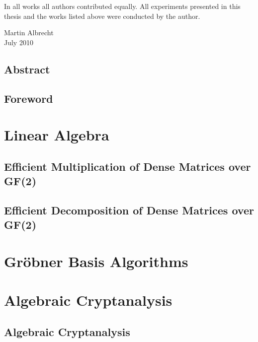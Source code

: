 \documentclass[a4paper,11pt]{report}
\theoremstyle{definition}
\begin{document}
In all works all authors contributed equally. All experiments presented in this thesis and the works listed above were conducted by the author.

\vspace{2cm}

\begin{flushright}
Martin Albrecht\\
July 2010
\end{flushright}

\chapter*{Abstract}


\chapter*{Foreword}


\newpage

\setcounter{tocdepth}{1}
\tableofcontents


\part{Linear Algebra}
\label{part:la}

\chapter{Efficient Multiplication of Dense Matrices over GF(2)}
\label{chapter:matmul}


\chapter{Efficient Decomposition of Dense Matrices over GF(2)}
\label{chapter:matelim}


\part{\texorpdfstring{Gröbner}{Groebner} Basis Algorithms}
\label{part:gb}



\part{Algebraic Cryptanalysis}
\label{part:ac}

\chapter{Algebraic Cryptanalysis}
\label{chapter:algebraic_attacks}

\end{document}
